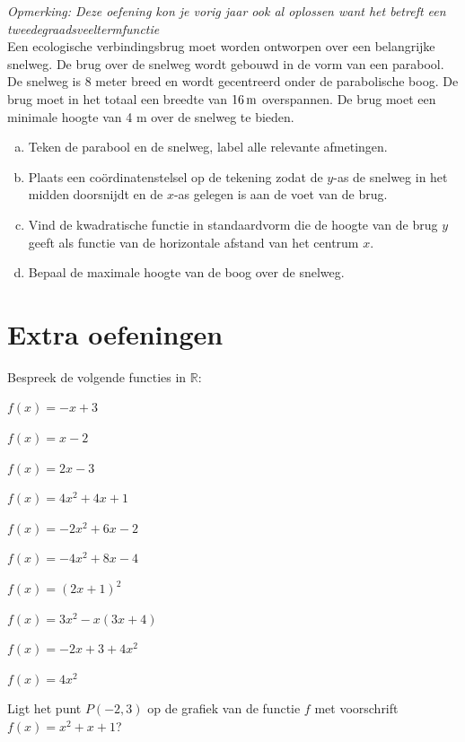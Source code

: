 \documentclass[12pt,twoside,a4paper]{article}
\begin{document}
\begin{oefening}{\scriptsize\em Opmerking: Deze oefening kon je vorig jaar ook al oplossen want het betreft een tweedegraadsveeltermfunctie}\\
Een ecologische verbindingsbrug moet worden ontworpen over een belangrijke snelweg. De brug over de snelweg wordt gebouwd in de vorm van een parabool. De snelweg is 8 meter breed en wordt gecentreerd onder de parabolische boog. De brug moet in het totaal een breedte van $16 \m$ overspannen. De brug moet een minimale hoogte van 4 m over de snelweg te bieden.
\begin{enumerate}[(a)]
  \item Teken de parabool en de snelweg, label alle relevante afmetingen.
  \item Plaats een coördinatenstelsel op de tekening zodat de $y$-as de snelweg in het midden doorsnijdt en de $x$-as gelegen is aan de voet van de brug.
  \item Vind de kwadratische functie in standaardvorm die de hoogte van de brug $y$ geeft als functie van de horizontale afstand van het centrum $x$.
  \item Bepaal de maximale hoogte van de boog over de snelweg.
\end{enumerate}
\end{oefening}

\cleardoublepage
\section{Extra oefeningen}

\begin{oefening}
Bespreek de volgende functies in $\mathbb{R}$:
\begin{exlist}{2}
  \item $f(x)=-x+3$
  \item $f(x)=x-2$
  \item $f(x)=2x-3$
  \item $f(x)=4x^2+4x+1$
  \item $f(x)=-2x^2+6x-2$
  \item $f(x)=-4x^2+8x-4$
  \item $f(x)=(2x+1)^2$
  \item $f(x)=3x^2-x(3x+4)$
  \item $f(x)=-2x+3+4x^2$
  \item $f(x)=4x^2$
\end{exlist}
\end{oefening}

\begin{oefening}
Ligt het punt $P(-2,3)$ op de grafiek van de functie $f$ met voorschrift $f(x)=x^2+x+1$?
\end{oefening}
\end{document}
